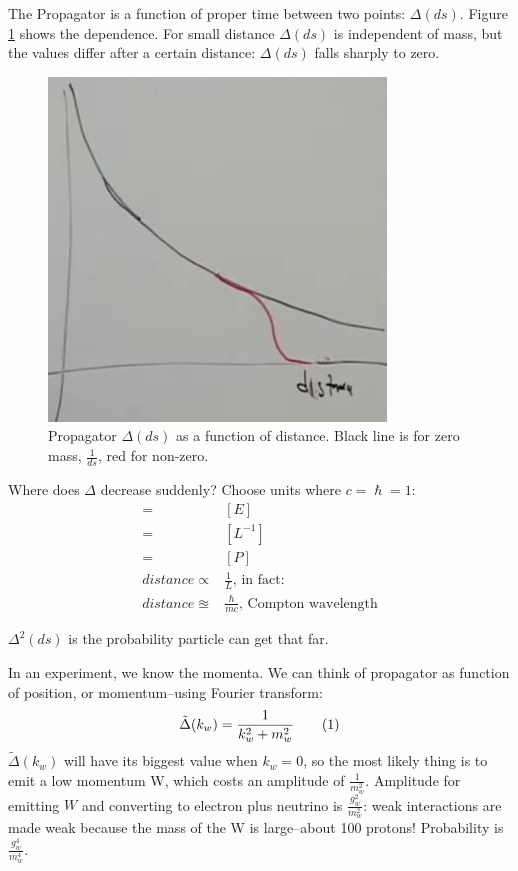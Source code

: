 \documentclass[]{article}
\newcommand\numberthis{\addtocounter{equation}{1}\tag{\theequation}}
\begin{document}
The Propagator is a function of proper time between two points: $\Delta(ds)$. Figure \ref{fig:2-6-propagator} shows the dependence. For small distance $\Delta(ds)$ is independent of mass, but the values differ  after a certain distance: $\Delta(ds)$ falls sharply to zero.

\begin{figure}[H]
	\caption[Propagator $\Delta(ds)$ as a function of distance.]{Propagator $\Delta(ds)$ as a function of distance. Black line is for zero mass, $\frac{1}{ds}$, red for non-zero.}\label{fig:2-6-propagator}
	\includegraphics[width=0.8\textwidth]{2-6-propagator}
\end{figure}

Where does $\Delta$ decrease suddenly? Choose units where $c=\hslash=1$:
\begin{align*}
	[m] =& [E]\\
	=& [L^{-1}]\\
	=& [P]\\
	distance \propto & \frac{1}{L} \text{, in fact:}\\
	distance \approxeq & \frac{\hslash}{mc} \text {, Compton wavelength}
\end{align*}

$\Delta^2(ds)$ is the probability particle can get that far.

In an experiment, we know the momenta. We can think of propagator as function of position, or momentum--using Fourier transform:
\begin{align*}
\tilde{\Delta}(k_w)=\frac{1}{k_w^2+m_w^2} \numberthis \label{eq:Delta}
\end{align*}
 $\tilde{\Delta}(k_w)$ will have its biggest value when $k_w=0$, so the most likely thing is to emit a low momentum W, which costs an amplitude of $\frac{1}{m_w^2}$. Amplitude for emitting $W$ and converting to electron plus neutrino is $\frac{g_w^2}{m_w^2}$: weak interactions are made weak because the mass of the W is large--about 100 protons! Probability is $\frac{g_w^4}{m_w^4}$.
 
\end{document}
